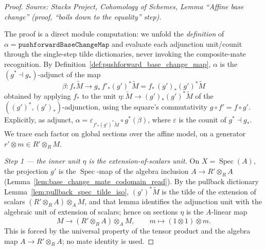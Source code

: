 \begin{proof}
  \textit{Source: Stacks Project, Cohomology of Schemes, Lemma ``Affine base
  change'' (proof, ``boils down to the equality'' step).}

  The proof is a direct module computation: we unfold the \emph{definition} of
  \(\alpha = \mathtt{pushforwardBaseChangeMap}\) and evaluate each adjunction
  unit/counit through the single-step tilde dictionaries, never invoking the
  composite-mate recognition. By
  Definition~\ref{def:pushforward_base_change_map}, \(\alpha\) is the
  \((g^* \dashv g_*)\)-adjunct of the map
  \[
    \beta : f_*\widetilde M \longrightarrow g_*\,f'_*(g')^*\widetilde M
          = f_*\,(g')_*(g')^*\widetilde M
  \]
  obtained by applying \(f_*\) to the unit
  \(\eta : \widetilde M \to (g')_*(g')^*\widetilde M\) of the
  \(((g')^*, (g')_*)\)-adjunction, using the square's commutativity
  \(g \circ f' = f \circ g'\). Explicitly, as adjunct,
  \(\alpha = \varepsilon_{f'_*(g')^*\widetilde M} \circ g^*(\beta)\), where
  \(\varepsilon\) is the counit of \(g^* \dashv g_*\). We trace each factor on global
  sections over the affine model, on a generator \(r' \otimes m \in R' \otimes_R M\).

  \emph{Step 1 — the inner unit \(\eta\) is the extension-of-scalars unit.}
  On \(X = \operatorname{Spec}(A)\), the projection \(g'\) is the
  \(\operatorname{Spec}\)-map of the algebra inclusion \(A \to R' \otimes_R A\)
  (Lemma~\ref{lem:base_change_mate_codomain_read}). By the pullback dictionary
  Lemma~\ref{lem:pullback_spec_tilde_iso}, \((g')^*\widetilde M\) is the tilde of the
  extension of scalars \((R' \otimes_R A) \otimes_A M\), and that lemma identifies the
  adjunction unit with the algebraic unit of extension of scalars; hence on sections
  \(\eta\) is the \(A\)-linear map
  \[
    M \longrightarrow (R' \otimes_R A) \otimes_A M, \qquad
    m \longmapsto (1 \otimes 1) \otimes m .
  \]
  This is forced by the universal property of the tensor product and the algebra map
  \(A \to R' \otimes_R A\); no mate identity is used.


\end{proof}
